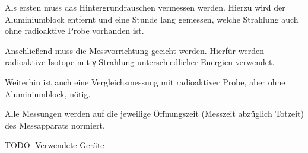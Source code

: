 Als ersten muss das Hintergrundrauschen vermessen werden. Hierzu wird der
Aluminiumblock entfernt und eine Stunde lang gemessen, welche Strahlung auch
ohne radioaktive Probe vorhanden ist.

Anschließend muss die Messvorrichtung geeicht werden. Hierfür werden radioaktive
Isotope mit γ-Strahlung unterschiedlicher Energien verwendet.

Weiterhin ist auch eine Vergleichsmessung mit radioaktiver Probe, aber ohne
Aluminiumblock, nötig.

Alle Messungen werden auf die jeweilige Öffnungszeit (Messzeit abzüglich Totzeit)
des Messapparats normiert.

TODO: Verwendete Geräte